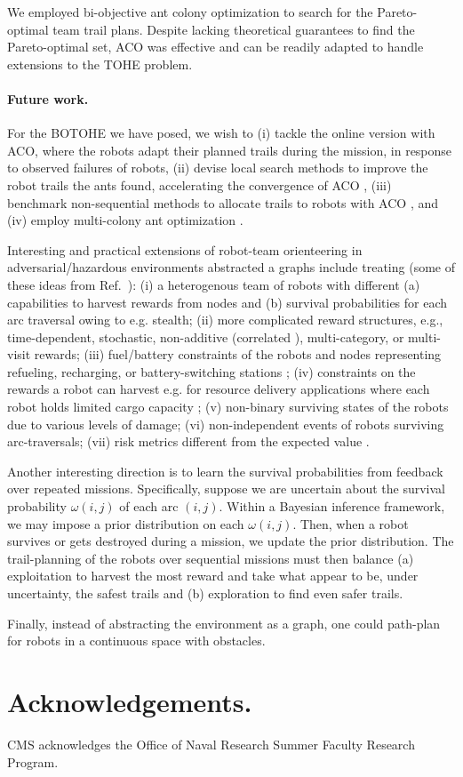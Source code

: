 \documentclass[11pt, oneside]{article}
\begin{document}
We employed bi-objective ant colony optimization to search for the Pareto-optimal team trail plans. Despite lacking theoretical guarantees to find the Pareto-optimal set, ACO was effective and can be readily adapted to handle extensions to the TOHE problem.

\paragraph{Future work.}

For the BOTOHE we have posed, we wish to (i) tackle the online version with ACO, where the robots adapt their planned trails during the mission, in response to observed failures of robots, (ii) devise local search methods to improve the robot trails the ants found, accelerating the convergence of ACO \cite{dorigo2006ant}, (iii) benchmark non-sequential methods to allocate trails to robots with ACO \cite{ke2008ants}, and (iv) employ multi-colony ant optimization \cite{iredi2001bi}.

Interesting and practical extensions of robot-team orienteering in adversarial/hazardous environments abstracted a graphs include treating (some of these ideas from Ref.~\cite{jorgensen2018team}): 
(i) a heterogenous team of robots with different (a) capabilities to harvest rewards from nodes and (b) survival probabilities for each arc traversal owing to e.g. stealth;
(ii) more complicated reward structures, e.g., time-dependent, stochastic, non-additive (correlated \cite{yu2014correlated}), multi-category, or multi-visit rewards;
(iii) fuel/battery constraints of the robots and nodes representing refueling, recharging, or battery-switching stations \cite{asghar2023risk,khuller2011fill,liao2016electric}; 
(iv) constraints on the rewards a robot can harvest e.g. for resource delivery applications where each robot holds limited cargo capacity \cite{coelho2014thirty};
(v) non-binary surviving states of the robots due to various levels of damage;
(vi) non-independent events of robots surviving arc-traversals;
(vii) risk metrics different from the expected value \cite{majumdar2020should}.

Another interesting direction is to learn the survival probabilities from feedback over repeated missions. 
Specifically, suppose we are uncertain about the survival probability $\omega(i, j)$ of each arc $(i,j)$. Within a Bayesian inference framework, we may impose a prior distribution on each $\omega(i,j)$. Then, when a robot survives or gets destroyed during a mission, we update the prior distribution. 
The trail-planning of the robots over sequential missions must then balance (a) exploitation to harvest the most reward and take what appear to be, under uncertainty, the safest trails and (b) exploration to find even safer trails.

Finally, instead of abstracting the environment as a graph, one could path-plan for robots in a continuous space with obstacles. 

\section*{Acknowledgements.} CMS acknowledges the Office of Naval Research Summer Faculty Research Program.



\end{document}
